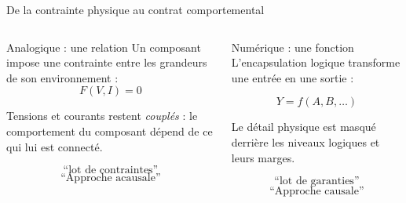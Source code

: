 \begin{frame}{De la contrainte physique au contrat comportemental}

  \begin{columns}[T]


  \begin{block}{Analogique : une relation}
  Un composant impose une \alert{contrainte} entre les
  grandeurs de son environnement :
  \[
          F(V,I)=0
  \]


  Tensions et courants restent
  \emph{couplés} : le comportement du composant dépend
  de ce qui lui est connecté.


  \centering
  \[
  \boxed{\text{``lot de contraintes''}}
  \]
  \centering
  \[
  \boxed{\text{``Approche acausale''}}
  \]

  \end{block}


  \begin{block}{Numérique : une fonction}
  L'encapsulation logique transforme une entrée en une
  \alert{sortie} :

  \[
          Y=f(A,B,\ldots)
  \]


  Le détail physique est masqué derrière les niveaux
  logiques et leurs marges.

  \medskip

  \centering
  \[
  \boxed{\text{``lot de garanties''}}
  \]
  \[
  \boxed{\text{``Approche causale''}}
  \]
  \end{block}

  \end{columns}


\end{frame}

